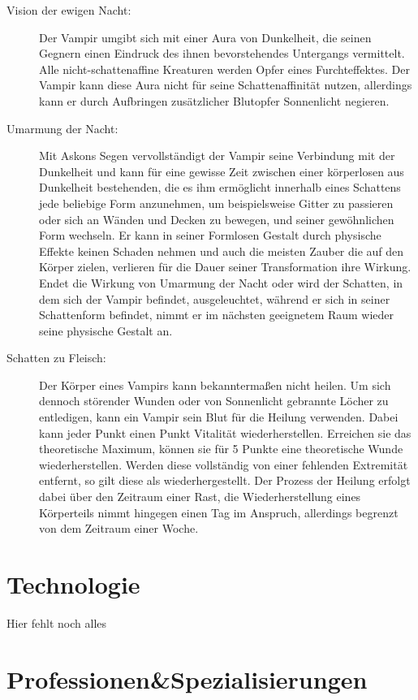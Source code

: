 \documentclass[a4paper,12pt,oneside]{book}
\begin{document}
\begin{description}
\begin{description}
\item[Vision der ewigen Nacht:]
Der Vampir umgibt sich mit einer Aura von Dunkelheit, die seinen Gegnern einen Eindruck des ihnen bevorstehendes Untergangs vermittelt. Alle nicht-schattenaffine Kreaturen werden Opfer eines Furchteffektes. Der Vampir kann diese Aura nicht für seine Schattenaffinität nutzen, allerdings kann er durch Aufbringen zusätzlicher Blutopfer Sonnenlicht negieren.
\item[Umarmung der Nacht:]
Mit Askons Segen vervollständigt der Vampir seine Verbindung mit der Dunkelheit und kann für eine gewisse Zeit zwischen einer körperlosen aus Dunkelheit bestehenden, die es ihm ermöglicht innerhalb eines Schattens jede beliebige Form anzunehmen, um beispielsweise Gitter zu passieren oder sich an Wänden und Decken zu bewegen, und seiner gewöhnlichen Form wechseln. Er kann in seiner Formlosen Gestalt durch physische Effekte keinen Schaden nehmen und auch die meisten Zauber die auf den Körper zielen, verlieren für die Dauer seiner Transformation ihre Wirkung. Endet die Wirkung von Umarmung der Nacht oder wird der Schatten, in dem sich der Vampir befindet, ausgeleuchtet, während er sich in seiner Schattenform befindet, nimmt er im nächsten geeignetem Raum wieder seine physische Gestalt an.
\item[Schatten zu Fleisch:]
Der Körper eines Vampirs kann bekanntermaßen nicht heilen. Um sich dennoch störender Wunden oder von Sonnenlicht gebrannte Löcher zu entledigen, kann ein Vampir sein Blut für die Heilung verwenden. Dabei kann jeder Punkt einen Punkt Vitalität wiederherstellen. Erreichen sie das theoretische Maximum, können sie für 5 Punkte eine theoretische Wunde wiederherstellen. Werden diese vollständig von einer fehlenden Extremität entfernt, so gilt diese als wiederhergestellt. Der Prozess der Heilung erfolgt dabei über den Zeitraum einer Rast, die Wiederherstellung eines Körperteils nimmt hingegen einen Tag im Anspruch, allerdings begrenzt von dem Zeitraum einer Woche.
\end{description}


\end{description}

{}
\printindex[Kreaturen]
\part{Technologie}
\setcounter{chapter}{0}
Hier fehlt noch alles\newpage
\part{Professionen\&Spezialisierungen}
\setcounter{chapter}{0}
\end{document}

